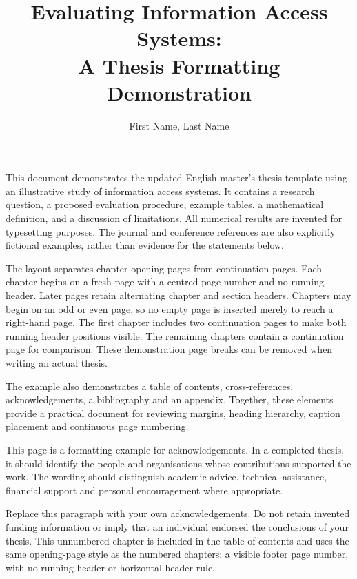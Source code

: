 \documentclass[a4paper,12pt,english,twoside,openany,dvipdfmx]{jsbook}
\title{Evaluating Information Access Systems:\\A Thesis Formatting Demonstration}
\author{First Name, Last Name}
\begin{document}
\maketitle

\begin{coverabstract}
This document demonstrates the updated English master's thesis template using
an illustrative study of information access systems. It contains a research
question, a proposed evaluation procedure, example tables, a mathematical
definition, and a discussion of limitations. All numerical results are invented
for typesetting purposes. The journal and conference references are also
explicitly fictional examples, rather than evidence for the statements below.

The layout separates chapter-opening pages from continuation pages. Each chapter
begins on a fresh page with a centred page number and no running header. Later
pages retain alternating chapter and section headers. Chapters may begin on
an odd or even page, so no empty page is inserted merely to reach a right-hand
page. The first chapter includes two continuation pages to make both running
header positions visible. The remaining chapters contain a continuation page
for comparison. These demonstration page breaks can be removed when writing
an actual thesis.

The example also demonstrates a table of contents,
cross-references, acknowledgements, a bibliography and an appendix. Together,
these elements provide a practical document for reviewing margins, heading
hierarchy, caption placement and continuous page numbering.
\end{coverabstract}

\tableofcontents









\begin{acknowledgement}
This page is a formatting example for acknowledgements. In a completed thesis,
it should identify the people and organisations whose contributions supported
the work. The wording should distinguish academic advice, technical assistance,
financial support and personal encouragement where appropriate.

Replace this paragraph with your own acknowledgements. Do not retain invented
funding information or imply that an individual endorsed the conclusions of
your thesis. This unnumbered chapter is included in the table of contents and
uses the same opening-page style as the numbered chapters: a visible footer
page number, with no running header or horizontal header rule.
\end{acknowledgement}




\appendix

\end{document}
